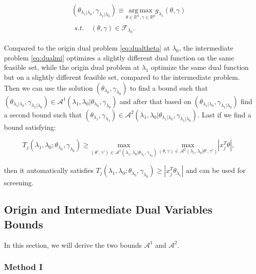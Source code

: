 \begin{gather}
        \label{eq:dualmi}
        (\theta_{\lambda_1|\lambda_0},\gamma_{\lambda_1|\lambda_0})\equiv\underset{\theta\in \mathbb{R}^{ n},\gamma\in\mathbb{R}^p}{\mathrm{arg\,max}}g_{\lambda_1}(\theta,\gamma)\\
        \begin{aligned}s.t.\quad (\theta,\gamma)\in \mathcal{F}_{\lambda_0}\nonumber.
        \end{aligned}
\end{gather}

Compared to the origin dual problem \eqref{eq:dualtheta} at $\lambda_0$, the intermediate problem \eqref{eq:dualmi} optimizes a slightly different dual function on the same feasible set, while the origin dual problem at $\lambda_1$ optimize the same dual function but on a slightly different feasible set, compared to the intermediate problem. Then we can use the solution $(\theta_{\lambda_0},\gamma_{\lambda_0})$ to find a bound such that $(\theta_{\lambda_1|\lambda_0},\gamma_{\lambda_1|\lambda_0})\in \mathcal{A}^1(\lambda_1,\lambda_0|\theta_{\lambda_0},\gamma_{\lambda_0})$ and after that based on $(\theta_{\lambda_1|\lambda_0},\gamma_{\lambda_1|\lambda_0})$ find a second bound such that $(\theta_{\lambda_1},\gamma_{\lambda_1})\in \mathcal{A}^2(\lambda_1,\lambda_0|\theta_{\lambda_1|\lambda_0},\gamma_{\lambda_1|\lambda_0})$. Last if we find a bound satisfying:

\begin{equation}
    \label{eq:boundbound}
    T_j(\lambda_{1},\lambda_{0};\theta_{\lambda_0},\gamma_{\lambda_0})\geq \underset{(\theta',\gamma')\in\mathcal{A}^1(\lambda_1,\lambda_0|\theta_{\lambda_0},\gamma_{\lambda_0})}{\mathrm{max}}\,\underset{(\theta,\gamma)\in\mathcal{A}^2(\lambda_1,\lambda_0|\theta',\gamma')}{\mathrm{max}}|x_j^T\theta|,
\end{equation}

then it automatically satisfies $T_j(\lambda_{1},\lambda_{0};\theta_{\lambda_0},\gamma_{\lambda_0})\geq |x_j^T\theta_{\lambda_1}|$ and can be used for screening.

\subsection{Origin and Intermediate Dual Variables Bounds}

In this section, we will derive the two bounds $\mathcal{A}^1$ and $\mathcal{A}^2$.

\subsubsection{Method I}

